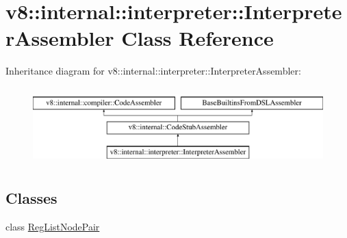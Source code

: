 \hypertarget{classv8_1_1internal_1_1interpreter_1_1InterpreterAssembler}{}\section{v8\+:\+:internal\+:\+:interpreter\+:\+:Interpreter\+Assembler Class Reference}
\label{classv8_1_1internal_1_1interpreter_1_1InterpreterAssembler}
Inheritance diagram for v8\+:\+:internal\+:\+:interpreter\+:\+:Interpreter\+Assembler\+:\begin{figure}[H]
\begin{center}
\leavevmode
\includegraphics[height=3.000000cm]{classv8_1_1internal_1_1interpreter_1_1InterpreterAssembler}
\end{center}
\end{figure}
\subsection*{Classes}
\begin{DoxyCompactItemize}
\item 
class \mbox{\hyperlink{classv8_1_1internal_1_1interpreter_1_1InterpreterAssembler_1_1RegListNodePair}{Reg\+List\+Node\+Pair}}
\end{DoxyCompactItemize}
